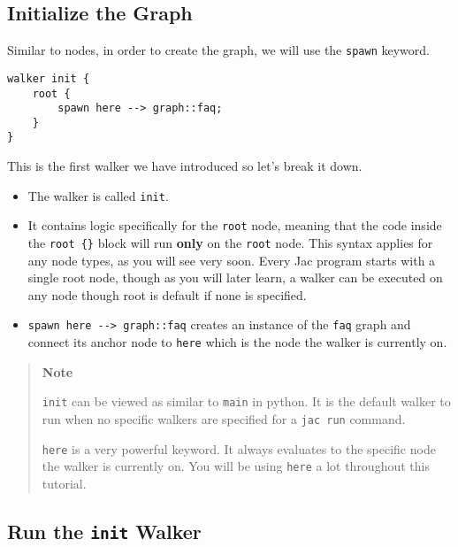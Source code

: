 \hypertarget{initialize-the-graph}{%
\subsection{Initialize the Graph}\label{initialize-the-graph}}

Similar to nodes, in order to create the graph, we will use the
\passthrough{\lstinline!spawn!} keyword.

\begin{lstlisting}
walker init {
    root {
        spawn here --> graph::faq;
    }
}
\end{lstlisting}

This is the first walker we have introduced so let's break it down.

\begin{itemize}
\tightlist
\item
  The walker is called \passthrough{\lstinline!init!}.
\item
  It contains logic specifically for the \passthrough{\lstinline!root!}
  node, meaning that the code inside the
  \passthrough{\lstinline!root \{\}!} block will run \textbf{only} on
  the \passthrough{\lstinline!root!} node. This syntax applies for any
  node types, as you will see very soon. Every Jac program starts with a
  single root node, though as you will later learn, a walker can be
  executed on any node though root is default if none is specified.
\item
  \passthrough{\lstinline!spawn here --> graph::faq!} creates an
  instance of the \passthrough{\lstinline!faq!} graph and connect its
  anchor node to \passthrough{\lstinline!here!} which is the node the
  walker is currently on.
\end{itemize}

\begin{quote}
\textbf{Note}

\passthrough{\lstinline!init!} can be viewed as similar to
\passthrough{\lstinline!main!} in python. It is the default walker to
run when no specific walkers are specified for a
\passthrough{\lstinline!jac run!} command.

\passthrough{\lstinline!here!} is a very powerful keyword. It always
evaluates to the specific node the walker is currently on. You will be
using \passthrough{\lstinline!here!} a lot throughout this tutorial.
\end{quote}

\hypertarget{run-the-init-walker}{%
\subsection{\texorpdfstring{Run the \texttt{init}
Walker}{Run the init Walker}}\label{run-the-init-walker}}

